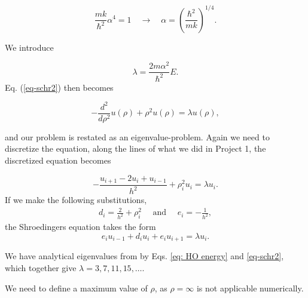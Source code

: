 \documentclass[a4paper]{article}
\begin{document}
\begin{equation}
\frac{mk}{\hbar^2} \alpha^4 = 1 \quad\rightarrow\quad \alpha = \left(\frac{\hbar^2}{mk}\right)^{1/4}.
\label{eq-schr2}
\end{equation}


We introduce

\begin{equation}
\lambda = \frac{2m\alpha^2}{\hbar^2}E.
\end{equation}
Eq. (\ref{eq-schr2}) then becomes

\begin{equation}
  -\frac{d^2}{d\rho^2} u(\rho) + \rho^2u(\rho)  = \lambda u(\rho) ,
\end{equation}

and our problem is restated as an eigenvalue-problem. Again we need to discretize the equation, along the lines of what we did in Project 1, the discretized equation becomes

\begin{equation}
-\frac{u_{i+1} -2u_i +u_{i-1}}{h^2}+\rho_i^2u_i = \lambda u_i.
\end{equation}
If we make the following substitutions,
\begin{align}
d_i = \frac{2}{h^2} + \rho_i^2 \quad\text{   and   }\quad e_i = -\frac{1}{h^2},
\end{align}
the Shroedingers equation takes the form
\begin{equation}
e_i u_{i-1} + d_i u_i + e_iu_{i+1} =  \lambda u_i.
\label{eq-schr3}
\end{equation}

We have analytical eigenvalues from by Eqs. \eqref{eq: HO energy} and \eqref{eq-schr2}, which together give $\lambda = 3, 7, 11, 15, \dots$.

We need to define a maximum value of $\rho$, as $\rho = \infty$ is not applicable numerically.
\end{document}

